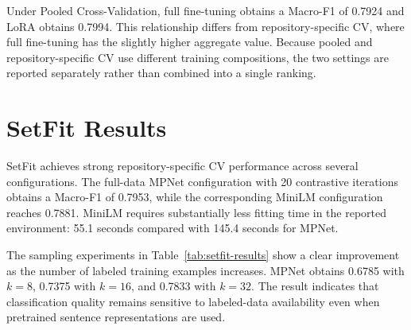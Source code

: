 Under Pooled Cross-Validation, full fine-tuning obtains a Macro-F1 of 0.7924 and LoRA obtains 0.7994. This relationship differs from repository-specific CV, where full fine-tuning has the slightly higher aggregate value. Because pooled and repository-specific CV use different training compositions, the two settings are reported separately rather than combined into a single ranking.

\section{SetFit Results}
SetFit achieves strong repository-specific CV performance across several configurations. The full-data MPNet configuration with 20 contrastive iterations obtains a Macro-F1 of 0.7953, while the corresponding MiniLM configuration reaches 0.7881. MiniLM requires substantially less fitting time in the reported environment: 55.1 seconds compared with 145.4 seconds for MPNet.

\begin{table}[H]
\centering
\caption{Performance and resource measurements of SetFit configurations.}
\label{tab:setfit-results}
\end{table}

The sampling experiments in Table~\ref{tab:setfit-results} show a clear improvement as the number of labeled training examples increases. MPNet obtains 0.6785 with $k=8$, 0.7375 with $k=16$, and 0.7833 with $k=32$. The result indicates that classification quality remains sensitive to labeled-data availability even when pretrained sentence representations are used.

